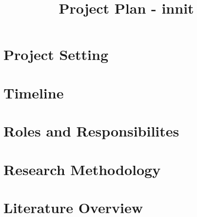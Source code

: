 \documentclass[conference]{IEEEtran}
\begin{document}
%
\title{Project Plan - innit}



\author{ 
}



\maketitle

\section{Project Setting}


\section{Timeline}


\section{Roles and Responsibilites}


\section{Research Methodology}


\section{Literature Overview}







\end{document}
